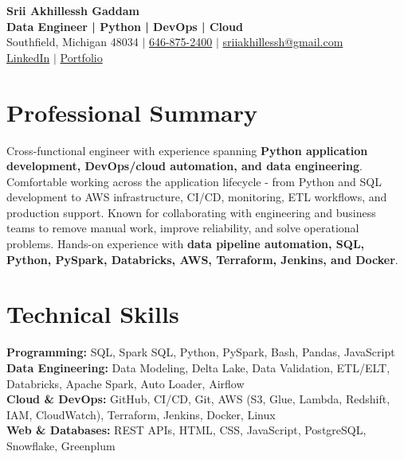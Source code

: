 \documentclass[letterpaper,10pt]{article}
\begin{document}
\fontsize{9.35pt}{10.45pt}\selectfont

\begin{center}
    {\LARGE \textbf{Srii Akhillessh Gaddam}} \\[-1pt]
    \textbf{Data Engineer | Python | DevOps | Cloud} \\[2pt]
    Southfield, Michigan 48034 $|$
    \href{tel:6468752400}{646-875-2400} $|$
    \href{mailto:sriiakhillessh@gmail.com}{sriiakhillessh@gmail.com} \\[1pt]
    \href{https://www.linkedin.com/in/srii-akhiilessh-gaddam-b48668191/}{LinkedIn} $|$
    \href{https://sriiakhillesshg.github.io/portfolio/}{Portfolio}
\end{center}
\vspace{-8pt}

\section{Professional Summary}
\small{Cross-functional engineer with experience spanning \textbf{Python application development, DevOps/cloud automation, and data engineering}. Comfortable working across the application lifecycle - from Python and SQL development to AWS infrastructure, CI/CD, monitoring, ETL workflows, and production support. Known for collaborating with engineering and business teams to remove manual work, improve reliability, and solve operational problems. Hands-on experience with \textbf{data pipeline automation, SQL, Python, PySpark, Databricks, AWS, Terraform, Jenkins, and Docker}.}

\section{Technical Skills}
\small{
\textbf{Programming:} SQL, Spark SQL, Python, PySpark, Bash, Pandas, JavaScript \\
\textbf{Data Engineering:} Data Modeling, Delta Lake, Data Validation, ETL/ELT, Databricks, Apache Spark, Auto Loader, Airflow \\
\textbf{Cloud \& DevOps:} GitHub, CI/CD, Git, AWS (S3, Glue, Lambda, Redshift, IAM, CloudWatch), Terraform, Jenkins, Docker, Linux \\
\textbf{Web \& Databases:} REST APIs, HTML, CSS, JavaScript, PostgreSQL, Snowflake, Greenplum
}

\end{document}
